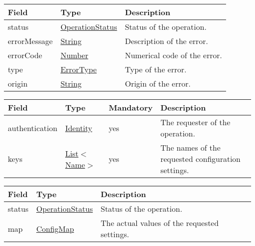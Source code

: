 \documentclass[a4paper]{arrowhead}
\newcommand{\pref}[1]{{\textcolor{ArrowheadGrey}{\hyperref[sec:model:primitives:#1]{#1}}}}
\begin{document}
\begin{table}[ht!]
\begin{tabularx}{\textwidth}{| p{2.5cm} | p{3cm} | X |} \hline
\rowcolor{gray!33} Field & Type      & Description \\ \hline
status & \pref{OperationStatus} & Status of the operation. \\ \hline
errorMessage & \pref{String} & Description of the error. \\ \hline
errorCode &\pref{Number}  & Numerical code of the error. \\ \hline
type & \pref{ErrorType} & Type of the error. \\ \hline
origin & \pref{String} & Origin of the error. \\ \hline
\end{tabularx}
\end{table}

\label{sec:model:ConfigRequest}
 
\begin{table}[ht!]
\begin{tabularx}{\textwidth}{| p{2.5cm} | p{2.5cm} | p{2cm} | X |} \hline
\rowcolor{gray!33} Field & Type & Mandatory & Description \\ \hline
authentication & \hyperref[sec:model:Identity]{Identity} & yes & The requester of the operation. \\ \hline
keys & \pref{List}$<$\pref{Name}$>$ & yes & The names of the requested configuration settings. \\ \hline
\end{tabularx}
\end{table}

\label{sec:model:ConfigResponse}

\begin{table}[ht!]
\begin{tabularx}{\textwidth}{| p{2.5cm} | p{2.5cm} | X |} \hline
\rowcolor{gray!33} Field & Type      & Description \\ \hline
status & \pref{OperationStatus} & Status of the operation. \\ \hline
map & \hyperref[sec:model:ConfigMap]{ConfigMap} & The actual values of the requested settings. \\ \hline
\end{tabularx}
\end{table}

\label{sec:model:Metadata}
\end{document}
